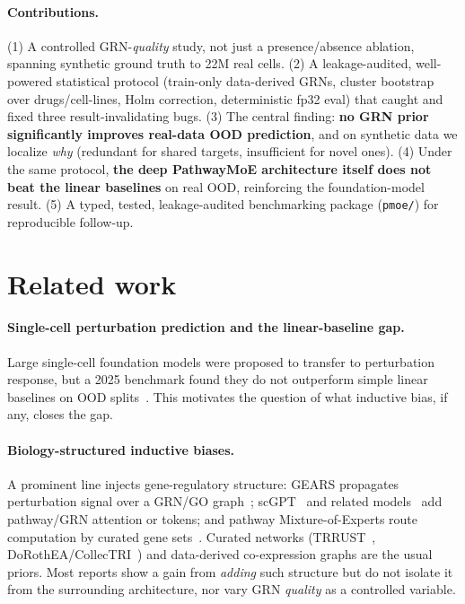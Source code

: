 \documentclass[11pt]{article}
\begin{document}
\paragraph{Contributions.} (1) A controlled GRN-\emph{quality} study, not just a presence/absence
ablation, spanning synthetic ground truth to 22M real cells. (2) A leakage-audited, well-powered
statistical protocol (train-only data-derived GRNs, cluster bootstrap over drugs/cell-lines, Holm
correction, deterministic fp32 eval) that caught and fixed three result-invalidating bugs. (3) The
central finding: \textbf{no GRN prior significantly improves real-data OOD prediction}, and on synthetic
data we localize \emph{why} (redundant for shared targets, insufficient for novel ones). (4) Under the
same protocol, \textbf{the deep PathwayMoE architecture itself does not beat the linear baselines} on
real OOD, reinforcing the foundation-model result. (5) A typed, tested, leakage-audited benchmarking
package (\texttt{pmoe/}) for reproducible follow-up.

\section{Related work}
\paragraph{Single-cell perturbation prediction and the linear-baseline gap.} Large single-cell
foundation models were proposed to transfer to perturbation response, but a 2025 benchmark found they do
not outperform simple linear baselines on OOD splits~\cite{nm2025benchmark}. This motivates the question
of what inductive bias, if any, closes the gap.

\paragraph{Biology-structured inductive biases.} A prominent line injects gene-regulatory structure:
GEARS propagates perturbation signal over a GRN/GO graph~\cite{gears}; scGPT~\cite{scgpt} and related
models~\cite{genept} add pathway/GRN attention or tokens; and pathway Mixture-of-Experts route
computation by curated gene sets~\cite{pathwaymoe_prior}. Curated networks (TRRUST~\cite{trrust},
DoRothEA/CollecTRI~\cite{dorothea,collectri}) and data-derived co-expression graphs are the usual priors.
Most reports show a gain from \emph{adding} such structure but do not isolate it from the surrounding
architecture, nor vary GRN \emph{quality} as a controlled variable.
\end{document}
